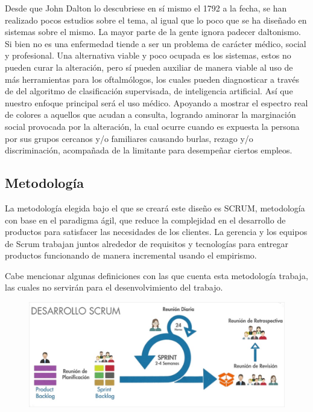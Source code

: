 \documentclass[10pt]{article}
\begin{document}
Desde que John Dalton lo descubriese en sí mismo el 1792 \cite{IEEEreferencias:Ref2} a la fecha, se han realizado pocos estudios sobre el tema, al igual que lo poco que se ha diseñado en sistemas sobre el mismo. La mayor parte de la gente ignora padecer daltonismo. Si bien no es una enfermedad tiende a ser un problema de carácter médico, social y profesional. Una alternativa viable y poco ocupada es los sistemas, estos no pueden curar la alteración, pero sí pueden auxiliar de manera viable al uso de más herramientas para los oftalmólogos, los cuales pueden diagnosticar a través de del algoritmo de clasificación supervisada, de inteligencia artificial. Así que nuestro enfoque principal será el uso médico. Apoyando a mostrar el espectro real de colores a aquellos que acudan a consulta, logrando aminorar la marginación social provocada por la alteración, la cual ocurre cuando es expuesta la persona por sus grupos cercanos y/o familiares causando burlas, rezago y/o discriminación, acompañada de la limitante para desempeñar ciertos empleos.

\subsection{Metodología}
La metodología elegida bajo el que se creará este diseño es SCRUM, metodología con base en el paradigma ágil, que reduce la complejidad en el desarrollo de productos para satisfacer las necesidades de los clientes. La gerencia y los equipos de Scrum trabajan juntos alrededor de requisitos y tecnologías para entregar productos funcionando de manera incremental usando el empirismo. 

Cabe mencionar algunas definiciones con las que cuenta esta metodología trabaja, las cuales no servirán para el desenvolvimiento del trabajo.

\begin{figure}[H]
	\begin{center}
\includegraphics[scale = 0.40]{Imagenes/desarrollo_scrum.jpg}
	\end{center} 
\end{figure}
\end{document}
